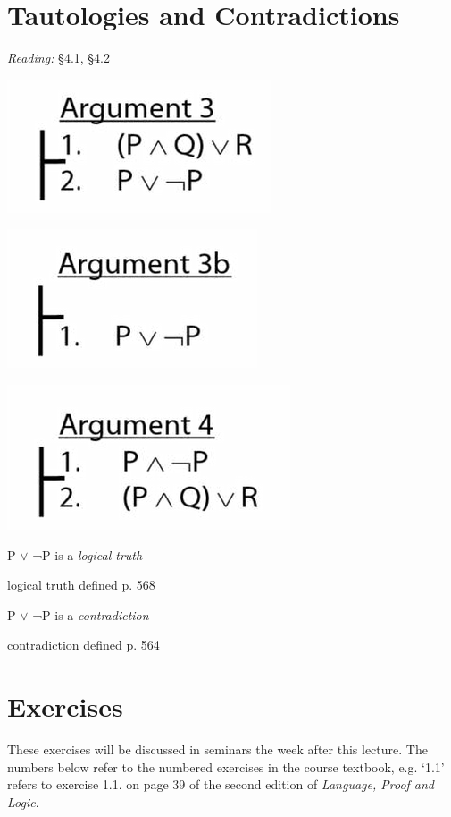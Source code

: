 \documentclass[12pt]{extarticle}
\begin{document}
\begin{multicols*}{3}
 
 
\section{Tautologies and Contradictions}
 
\emph{Reading:} §4.1, §4.2
 
\begin{center}
\includegraphics[scale=0.3]{img/unit_160_argument3.png}
\end{center}
\begin{center}
\includegraphics[scale=0.3]{img/unit_160_argument3b.png}
\end{center}
\begin{center}
\includegraphics[scale=0.3]{img/unit_160_argument4.png}
\end{center}
P $\lor{}$ ¬P is a \emph{logical truth}
 
logical truth defined p. 568
 
P $\lor{}$ ¬P is a \emph{contradiction}
 
contradiction defined p. 564
 
\vfill
\begin{minipage}{\columnwidth}
\section{Exercises}
These exercises will be discussed in seminars the week after this lecture.
The numbers below refer to the numbered exercises in the course textbook, e.g. `1.1' refers to exercise 1.1. on page 39 of the second edition of \emph{Language, Proof and Logic}.
 

\end{minipage}
\end{multicols*}
\end{document}
